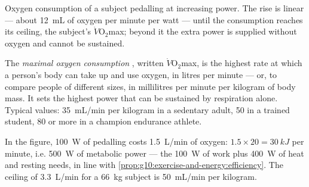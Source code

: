 \begin{omfigure}

{\small Oxygen consumption of a subject pedalling at increasing power.
The rise is linear --- about \qty{12}{mL} of oxygen per minute per watt
--- until the consumption reaches its ceiling, the subject's
$\dot V\!\mathrm{O_2}$max; beyond it the extra power is supplied
without oxygen and cannot be sustained.}
\end{omfigure}

\begin{definition}\label{def:g10:exercise-and-energy:vo2max}
The \emph{maximal oxygen consumption}
, written $\dot V\!\mathrm{O_2}$max, is the highest rate
at which a person's body can take up and use oxygen, in litres per
minute --- or, to compare people of different sizes, in millilitres
per minute per kilogram of body mass. It sets the highest power that
can be sustained by respiration alone. Typical values: \qty{35}{mL/min}
per kilogram in a sedentary adult, \num{50} in a trained student,
\num{80} or more in a champion endurance athlete.
\end{definition}

\begin{example}\label{ex:g10:exercise-and-energy:reading}
In the figure, \qty{100}{W} of pedalling costs \qty{1.5}{L/min} of
oxygen: $1.5 \times 20 = \qty{30}{kJ}$ per minute, i.e. \qty{500}{W} of
metabolic power --- the \qty{100}{W} of work plus \qty{400}{W} of heat
and resting needs, in line with
\cref{prop:g10:exercise-and-energy:efficiency}. The ceiling of
\qty{3.3}{L/min} for a \qty{66}{kg} subject is \qty{50}{mL/min} per
kilogram.
\end{example}

